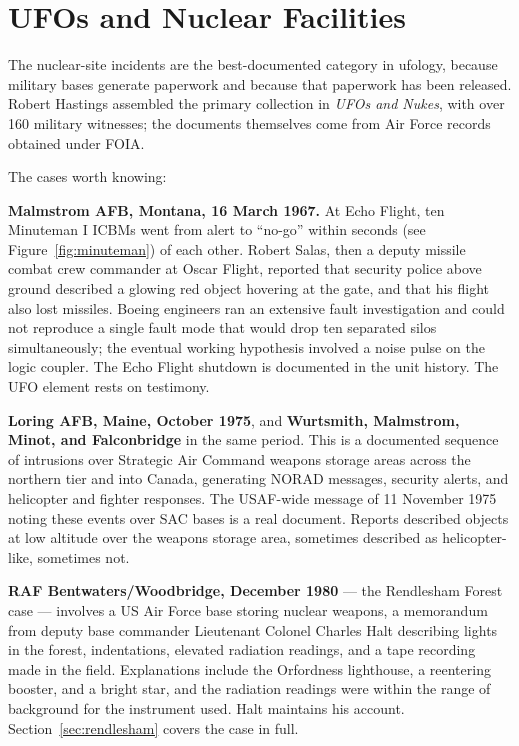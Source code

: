 \section{UFOs and Nuclear Facilities}\label{sec:ufosnuclearfacilities}

The nuclear-site incidents are the best-documented category in ufology, because military bases
generate paperwork and because that paperwork has been released. Robert Hastings assembled the
primary collection in \emph{UFOs and Nukes}, with over 160 military witnesses; the documents
themselves come from Air Force records obtained under FOIA.

The cases worth knowing:

\textbf{Malmstrom AFB, Montana, 16 March 1967.} At Echo Flight, ten Minuteman I ICBMs went from alert to ``no-go'' within seconds (see Figure~\ref{fig:minuteman}) of each other. Robert Salas, then a deputy missile combat crew
commander at Oscar Flight, reported that security police above ground described a glowing red
object hovering at the gate, and that his flight also lost missiles. Boeing engineers ran an
extensive fault investigation and could not reproduce a single fault mode that would drop ten
separated silos simultaneously; the eventual working hypothesis involved a noise pulse on the
logic coupler. The Echo Flight shutdown is documented in the unit history. The UFO element rests
on testimony.

\textbf{Loring AFB, Maine, October 1975}, and \textbf{Wurtsmith, Malmstrom, Minot, and Falconbridge}
in the same period. This is a documented sequence of intrusions over Strategic Air Command
weapons storage areas across the northern tier and into Canada, generating NORAD messages,
security alerts, and helicopter and fighter responses. The USAF-wide message of 11 November 1975
noting these events over SAC bases is a real document. Reports described objects at low altitude
over the weapons storage area, sometimes described as helicopter-like, sometimes not.

\textbf{RAF Bentwaters/Woodbridge, December 1980} --- the Rendlesham Forest case --- involves a
US Air Force base storing nuclear weapons, a memorandum from deputy base commander Lieutenant
Colonel Charles Halt describing lights in the forest, indentations, elevated radiation readings,
and a tape recording made in the field. Explanations include the Orfordness lighthouse, a
reentering booster, and a bright star, and the radiation readings were within the range of
background for the instrument used. Halt maintains his account. Section~\ref{sec:rendlesham} covers the case in full.

